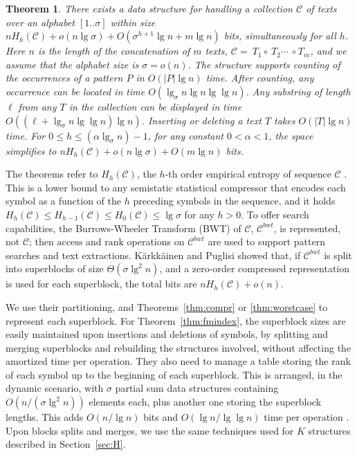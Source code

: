 \documentclass[11pt]{article}
\def\idrm#1{\ensuremath{\mathrm{#1}}}
\newtheorem{theorem}{Theorem}
\newcommand{\cP}{{ K}}
\newcommand{\ra}{\idrm{rank}}
\newcommand{\acc}{\idrm{access}}
\begin{document}
\begin{theorem} \label{thm:fmindexwc}
There exists a data structure for handling a collection $\mathcal{C}$ of
texts over an alphabet $[1..\sigma]$ within size
$nH_h(\mathcal{C})+o(n\lg\sigma)+
 O(\sigma^{h+1}\lg n + m\lg n)$ bits, 
simultaneously for all $h$. 
Here $n$ is the length of the concatenation
of $m$ texts, 
 $\mathcal{C}=\ T_1 \circ \ T_2 \cdots$ $\circ\ T_m$, and we assume that
the alphabet size is $\sigma=o(n)$.
The structure supports counting of the occurrences
of a pattern $P$ in $O(|P|\lg n)$ time.
After counting, any occurrence can be located in time $O(\lg_\sigma n\lg n\lg\lg n)$. 
Any substring of length $\ell$ from any $T$ in the collection can be displayed 
in time $O((\ell + \lg_\sigma n \lg\lg n) \lg n)$.
Inserting or 
deleting a text $T$ takes $O(|T|\lg n)$ time.
For $0 \le h \le (\alpha \lg_\sigma n)-1$, for any constant $0<\alpha<1$, the 
space simplifies to $nH_h(\mathcal{C})+o(n\lg\sigma)+O(m\lg n)$ bits.
\end{theorem}

The theorems refer to $H_h(\mathcal{C})$, the $h$-th order empirical 
entropy of sequence $\mathcal{C}$ \cite{Man01}. This is a lower bound to any
semistatic statistical compressor that encodes each symbol as a function of
the $h$ preceding symbols in the sequence, and it holds $H_h(\mathcal{C}) \le
H_{h-1}(\mathcal{C}) \le H_0(\mathcal{C}) \le \lg\sigma$ for any $h>0$.
To offer search capabilities, the Burrows-Wheeler Transform (BWT)
\cite{BW94} of $\mathcal{C}$, $\mathcal{C}^{bwt}$, is represented, not 
$\mathcal{C}$; then $\acc$ and $\ra$ operations on $\mathcal{C}^{bwt}$ 
are used to support pattern
searches and text extractions. K\"arkk\"ainen and Puglisi \cite{KP11} showed 
that, if 
$\mathcal{C}^{bwt}$ is split into superblocks of size $\Theta(\sigma\lg^2 n)$,
and a zero-order compressed representation is used for each superblock, the
total bits are $nH_h(\mathcal{C}) +o(n)$.

We use their partitioning, and Theorems~\ref{thm:compr} or
\ref{thm:worstcase} to represent each superblock. 
For Theorem~\ref{thm:fmindex}, the superblock sizes are easily maintained upon 
insertions and deletions of symbols, by splitting and merging superblocks and 
rebuilding the structures involved, without affecting the amortized time per 
operation. They \cite{KP11} also need to manage a table storing the rank of 
each symbol up to the beginning of each superblock. This is arranged, in the 
dynamic scenario, with $\sigma$ partial sum data structures containing 
$O(n/(\sigma\lg^2 n))$ elements each, plus another one storing the superblock 
lengths. This adds $O(n/\lg n)$ bits and $O(\lg n / \lg\lg n)$ time per 
operation \cite[Lem.~1]{NS10}. Upon blocks splits and merges, we use the
same techniques used for $\cP$ structures described in Section~\ref{sec:H}.
\end{document}
